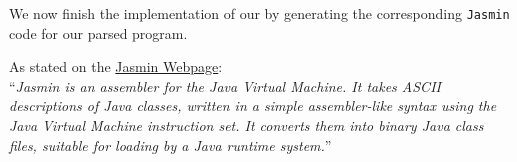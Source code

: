 \documentclass[a4paper]{article}
\begin{document}


\begin{exercise}{10}
  We now finish the implementation of our \icompiler{} by generating the corresponding \texttt{Jasmin} code for our parsed program.

  As stated on the \href{http://jasmin.sourceforge.net/}{Jasmin Webpage}:\\
  ``\emph{Jasmin is an assembler for the Java Virtual Machine. It takes ASCII descriptions of Java classes, written in a simple assembler-like syntax using the Java Virtual Machine instruction set. It converts them into binary Java class files, suitable for loading by a Java runtime system.}''


\end{exercise}
\end{document}

